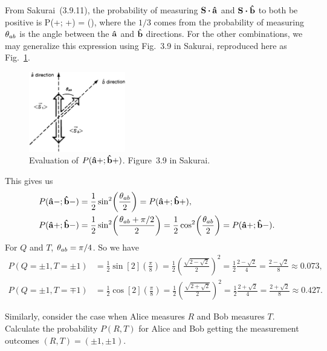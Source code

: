 \begin{solution}
	From Sakurai~(3.9.11), the probability of measuring $\vS \vdot \ah$ and $\vS \vdot \bh$ to both be positive is
	\beq
		P(\ah+; \bh+) =  \sin[2](),
	\eeq
	where the $1/3$ comes from the probability of measuring $\theta_{ab}$ is the angle between the $\vb{\hat{a}}$ and $\vb{\hat{b}}$ directions.  For the other combinations, we may generalize this expression using Fig.~3.9 in Sakurai, reproduced here as Fig.~\ref{sakurai}.
	
	\begin{figure} \centering
		\includegraphics[width=0.375\textwidth]{3-9.jpg}
		\caption{Evaluation of $P(\vb{\hat{a}}+; \vb{\hat{b}}+)$.  Figure~3.9 in Sakurai.}
		\label{sakurai}
	\end{figure}

	This gives us
	\begin{align}
		P(\vb{\hat{a}}-; \vb{\hat{b}}-) &= \frac{1}{2} \sin[2](\frac{\theta_{ab}}{2}) = P(\vb{\hat{a}}+; \vb{\hat{b}}+), \label{prob1} \\
		P(\vb{\hat{a}}+; \vb{\hat{b}}-) &= \frac{1}{2} \sin[2](\frac{\theta_{ab} + \pi/2}{2}) = \frac{1}{2} \cos[2](\frac{\theta_{ab}}{2}) = P(\vb{\hat{a}}+; \vb{\hat{b}}-). \label{prob2}
	\end{align}
	For $Q$ and $T$, $\theta_{ab} = \pi / 4$.  So we have
	\begin{align*}
		P(Q=\pm1, T=\pm1) &= \frac{1}{2} \sin[2](\frac{\pi}{8})
		= \frac{1}{2} \left( \frac{\sqrt{2 - \sqrt{2}}}{2} \right)^2
		= \frac{1}{2} \frac{2 - \sqrt{2}}{4}
		= \frac{2 - \sqrt{2}}{8}
		\approx 0.073, \\
		P(Q=\pm1, T=\mp1) &= \frac{1}{2} \cos[2](\frac{\pi}{8})
		= \frac{1}{2} \left( \frac{\sqrt{2 + \sqrt{2}}}{2} \right)^2
		= \frac{1}{2} \frac{2 + \sqrt{2}}{4}
		= \frac{2 + \sqrt{2}}{8}
		\approx 0.427.
	\end{align*}
	\vfix
\end{solution}
\vspace{-2\baselineskip}


\newcommand{\kRp}{\ket{R_+}}
\newcommand{\kRm}{\ket{R_-}}
\newcommand{\kSp}{\ket{S_+}}
\newcommand{\kSm}{\ket{S_-}}

\begin{problem}
	Similarly, consider the case when Alice measures $R$ and Bob measures $T$.  Calculate the probability $P(R, T)$ for Alice and Bob getting the measurement outcomes $(R, T) = (\pm1, \pm1)$.
\end{problem}

